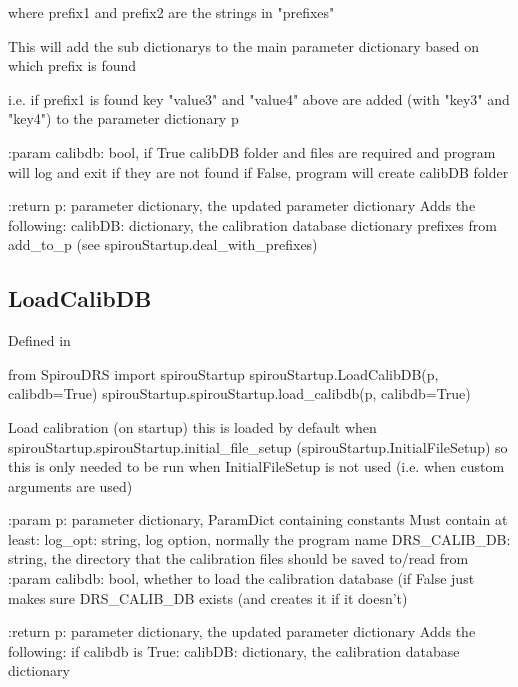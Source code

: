 \begin{minipage}{\textwidth}
\begin{pythondocstring}
        where prefix1 and prefix2 are the strings in "prefixes"

        This will add the sub dictionarys to the main parameter dictionary
        based on which prefix is found

        i.e. if prefix1 is found key "value3" and "value4" above are added
        (with "key3" and "key4") to the parameter dictionary p

:param calibdb: bool, if True calibDB folder and files are required and
                program will log and exit if they are not found
                if False, program will create calibDB folder

:return p: parameter dictionary, the updated parameter dictionary
        Adds the following:
            calibDB: dictionary, the calibration database dictionary
            prefixes from add_to_p (see spirouStartup.deal_with_prefixes)
\end{pythondocstring}
\end{minipage}


\noindent\begin{minipage}{\textwidth}
\subsection{LoadCalibDB}

Defined in \spirouStartup{}

\begin{pythonbox}
from SpirouDRS import spirouStartup
spirouStartup.LoadCalibDB(p, calibdb=True)
spirouStartup.spirouStartup.load_calibdb(p, calibdb=True)
\end{pythonbox}

\begin{pythondocstring}
Load calibration (on startup) this is loaded by default when
spirouStartup.spirouStartup.initial_file_setup
(spirouStartup.InitialFileSetup) so this is only needed to be run when
InitialFileSetup is not used (i.e. when custom arguments are used)


:param p: parameter dictionary, ParamDict containing constants
    Must contain at least:
            log_opt: string, log option, normally the program name
            DRS_CALIB_DB: string, the directory that the calibration
                          files should be saved to/read from
:param calibdb: bool, whether to load the calibration database (if False
                just makes sure DRS_CALIB_DB exists (and creates it if it
                doesn't)

:return p: parameter dictionary, the updated parameter dictionary
        Adds the following:
            if calibdb is True:
                calibDB: dictionary, the calibration database dictionary
\end{pythondocstring}
\end{minipage}
